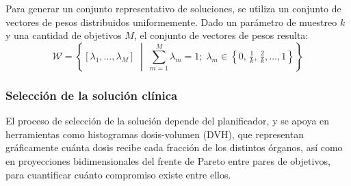Para generar un conjunto representativo de soluciones, se utiliza un conjunto de vectores de pesos distribuidos uniformemente. Dado un parámetro de muestreo \(k\) y una cantidad de objetivos \(M\), el conjunto de vectores de pesos resulta:
\[
\mathcal{W}
=
\left\{
[\lambda_1, \ldots, \lambda_M]
\;\middle|\;
\sum_{m=1}^{M} \lambda_m = 1;\;
\lambda_m \in \left\{0,\,\tfrac{1}{k},\,\tfrac{2}{k},\ldots,1\right\}
\right\}
\]

\subsubsection*{Selección de la solución clínica}

El proceso de selección de la solución depende del planificador, y se apoya en herramientas como histogramas dosis-volumen (DVH), que representan gráficamente cuánta dosis recibe cada fracción de los distintos órganos, así como en proyecciones bidimensionales del frente de Pareto entre pares de objetivos, para cuantificar cuánto compromiso existe entre ellos.
